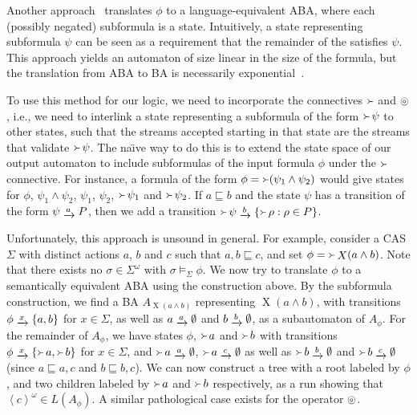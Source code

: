 \documentclass[a4paper]{article}
\newcommand{\angl}[1]{\left\langle#1\right\rangle}
\newcommand{\myrightarrow}[1]{\mathrel{\raisebox{-3pt}{$\xrightarrow{#1}$}}}
\newcommand{\composable}{\mathop{\ocircle}\nolimits}
\theoremstyle{definition}
\newcommand{\nxt}{\mathop{X}\nolimits}
\newcommand{\captures}{\mathop{\Yright}}
\begin{document}
\begin{appendix}
Another approach~\cite{muller-saoudi-schupp-1988} translates $\phi$ to a language-equivalent ABA, where each (possibly negated) subformula is a state. Intuitively, a state representing subformula $\psi$ can be seen as a requirement that the remainder of the satisfies $\psi$. This approach yields an automaton of size linear in the size of the formula, but the translation from ABA to BA is necessarily exponential~\cite{boker-kupferman-rosenberg-2010}.

To use this method for our logic, we need to incorporate the connectives $\captures$ and $\composable$, i.e., we need to interlink a state representing a subformula of the form $\captures \psi$ to other states, such that the streams accepted starting in that state are the streams that validate $\captures \psi$. The na\"{\i}ve way to do this is to extend the state space of our output automaton to include subformulas of the input formula $\phi$ under the $\captures$ connective. For instance, a formula of the form $\phi = \captures (\psi_1 \wedge \psi_2)$ would give states for $\phi$, $\psi_1 \wedge \psi_2$, $\psi_1$, $\psi_2$, $\captures \psi_1$ and $\captures \psi_2$. If $a \sqsubseteq b$ and the state $\psi$ has a transition of the form $\psi \myrightarrow{a} P$, then we add a transition $\captures \psi \myrightarrow{b} \{ \captures \rho : \rho \in P \}$.

Unfortunately, this approach is unsound in general. For example, consider a CAS $\Sigma$ with distinct actions $a$, $b$ and $c$ such that $a, b \sqsubseteq c$, and set $\phi = \captures \nxt (a \wedge b)$. Note that there exists no $\sigma \in \Sigma^\omega$ with $\sigma \models_\Sigma \phi$. We now try to translate $\phi$ to a semantically equivalent ABA using the construction above. By the subformula construction, we find a BA $A_{\nxt (a \wedge b)}$ representing $\nxt (a \wedge b)$, with transitions $\phi \myrightarrow{x} \{ a,  b \}$ for $x \in \Sigma$, as well as $a \myrightarrow{a} \emptyset$ and $b \myrightarrow{b} \emptyset$, as a subautomaton of $A_\phi$. For the remainder of $A_\phi$, we have states $\phi$, $\captures a$ and $\captures b$ with transitions $\phi \myrightarrow{x} \{ \captures a, \captures b \}$ for $x \in \Sigma$, and $\captures a \myrightarrow{a} \emptyset$, $\captures a \myrightarrow{c} \emptyset$ as well as $\captures b \myrightarrow{b} \emptyset$ and $\captures b \myrightarrow{c} \emptyset$ (since $a \sqsubseteq a, c$ and $b \sqsubseteq b, c$). We can now construct a tree with a root labeled by $\phi$, and two children labeled by $\captures a$ and $\captures b$ respectively, as a run showing that $\angl{c}^\omega \in L(A_\phi)$. A similar pathological case exists for the operator $\composable$.


\end{appendix}
\end{document}
